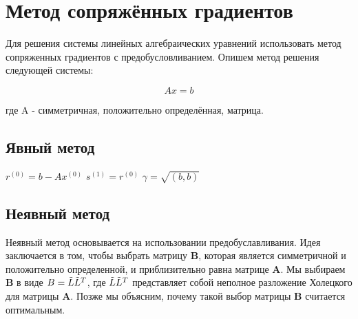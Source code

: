 \section{Метод сопряжённых градиентов}

Для решения системы линейных алгебраических уравнений использовать метод
сопряженных градиентов с предобусловливанием. Опишем метод решения следующей системы:

\[
  Ax = b
\]

где A - симметричная, положительно определённая, матрица.

\subsection{Явный метод}

\SetAlFnt{\normalsize}
\SetAlgoNoLine

\begin{algorithm*}[H]
  \DontPrintSemicolon
  $r^{(0)} = b - Ax^{(0)} $ \;
  $s^{(1)} = r^{(0)} $ \;
  $ \gamma = \sqrt{(b, b)} $

\end{algorithm*}

\subsection{Неявный метод}

Неявный метод основывается на использовании предобуславливания. 
Идея заключается в том, чтобы выбрать матрицу \textbf{B}, которая является
симметричной и положительно определенной, и приблизительно равна 
матрице \textbf{A}. Мы выбираем \textbf{B} в виде
$B = \Tilde{L} \Tilde{L}^T $, где $\Tilde{L} \Tilde{L}^T$ представляет собой 
неполное разложение Холецкого для матрицы \textbf{A}.
Позже мы объясним, почему такой выбор матрицы \textbf{B} считается оптимальным.

